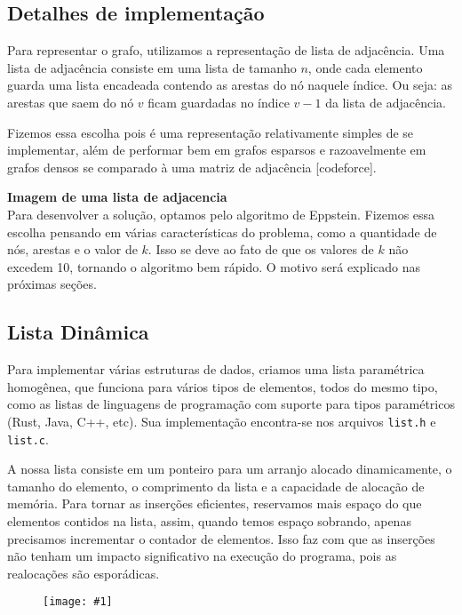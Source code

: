 \documentclass[12pt]{article}
\newcommand\image[2]{\noindent \begin{figure}[h]
    \texttt{[image: \#1]}
    \caption{#2}
    \label{fig: #1}
    \end{figure}
    }
\begin{document}
    \subsection{Detalhes de implementação}
    Para representar o grafo, utilizamos a representação de lista de adjacência.
    Uma lista de adjacência consiste em uma lista de tamanho $n$, onde cada
    elemento guarda uma lista encadeada contendo as arestas do nó naquele
    índice. Ou seja: as arestas que saem do nó $v$ ficam guardadas no índice
    $v-1$ da lista de adjacência.

    Fizemos essa escolha pois é uma representação relativamente simples de se
    implementar, além de performar bem em grafos esparsos e razoavelmente em
    grafos densos se comparado à uma matriz de adjacência [codeforce].

    \textbf{Imagem de uma lista de adjacencia}
    \\

    Para desenvolver a solução, optamos pelo algoritmo de Eppstein. Fizemos essa
    escolha pensando em várias características do problema, como a quantidade de
    nós, arestas e o valor de $k$. Isso se deve ao fato de que os valores de $k$
    não excedem 10, tornando o algoritmo bem rápido. O motivo será explicado nas
    próximas seções.

    \subsection{Lista Dinâmica}
    Para implementar várias estruturas de dados, criamos uma lista paramétrica
    homogênea, que funciona para vários tipos de elementos, todos do mesmo tipo,
    como as listas de linguagens de programação com suporte para tipos
    paramétricos (Rust, Java, C++, etc). Sua implementação encontra-se nos
    arquivos \texttt{list.h} e \texttt{list.c}.

    A nossa lista consiste em um ponteiro para um arranjo alocado dinamicamente,
    o tamanho do elemento, o comprimento da lista e a capacidade de alocação de
    memória. Para tornar as inserções eficientes, reservamos mais espaço do que
    elementos contidos na lista, assim, quando temos espaço sobrando, apenas
    precisamos incrementar o contador de elementos. Isso faz com que as
    inserções não tenham um impacto significativo na execução do programa, pois
    as realocações são esporádicas.

    \image{lista}

    \newpage
\end{document}
